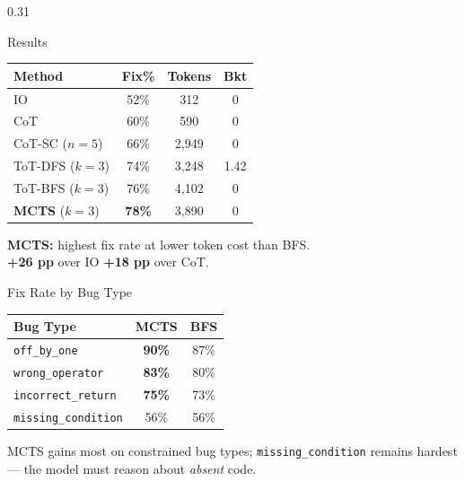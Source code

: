 \documentclass[final]{beamer}
\begin{document}
\begin{frame}[t]{}
\begin{columns}[t,totalwidth=\textwidth]
\begin{column}{0.31\textwidth}
\begin{exampleblock}{Results}
\centering
\begin{tabular}{@{} l c c c @{}}
\toprule
\textbf{Method} & \textbf{Fix\%} & \textbf{Tokens} & \textbf{Bkt} \\
\midrule
IO                       & 52\%          & 312   & 0    \\
CoT                      & 60\%          & 590   & 0    \\
CoT-SC ($n{=}5$)         & 66\%          & 2,949 & 0    \\
ToT-DFS ($k{=}3$)        & 74\%          & 3,248 & 1.42 \\
ToT-BFS ($k{=}3$)        & 76\%          & 4,102 & 0    \\
\textbf{MCTS} ($k{=}3$) & \textbf{78\%} & 3,890 & 0    \\
\bottomrule
\end{tabular}
\vspace{0.4cm}

\raggedright
\textbf{MCTS:} highest fix rate at lower token cost than BFS.\\
\textbf{+26 pp} over IO \quad \textbf{+18 pp} over CoT.
\end{exampleblock}

\vspace{0.6cm}

\begin{block}{Fix Rate by Bug Type}
\centering
\begin{tabular}{@{} l c c @{}}
\toprule
\textbf{Bug Type} & \textbf{MCTS} & \textbf{BFS} \\
\midrule
\texttt{off\_by\_one}       & \textbf{90\%} & 87\% \\
\texttt{wrong\_operator}    & \textbf{83\%} & 80\% \\
\texttt{incorrect\_return}  & \textbf{75\%} & 73\% \\
\texttt{missing\_condition} & 56\%          & 56\% \\
\bottomrule
\end{tabular}
\vspace{0.4cm}

\raggedright
MCTS gains most on constrained bug types; \texttt{missing\_condition} remains hardest --- the model must reason about \emph{absent} code.
\end{block}

\vspace{0.6cm}


\end{column}
\end{columns}
\end{frame}
\end{document}
